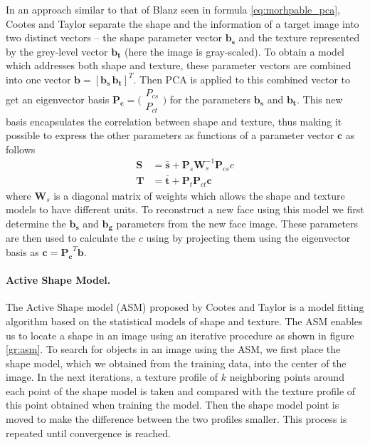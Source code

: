 \documentclass[11pt,a4paper,twoside]{report}
\begin{document}
In an approach similar to that of Blanz seen in formula \ref{eq:morhpable_pca}, Cootes and Taylor separate the shape and the information of a target image into
two distinct vectors -- the shape parameter vector $\mathbf{b_s}$ and the texture
represented by the grey-level vector $\mathbf{b_t}$ (here the image is
gray-scaled). To obtain a model which addresses both shape and texture, these
parameter vectors are combined into one vector $\mathbf{b} = [\mathbf{b_s}\, \mathbf{b_t}]^T$. Then PCA is applied to this combined vector to get an
eigenvector basis $\mathbf{P_c} =
\bigl( \begin{smallmatrix}P_{cs}\\P_{ct}\end{smallmatrix} \bigr)$ for the parameters $\mathbf{b_s}$ and
$\mathbf{b_t}$. This new basis encapsulates the correlation between shape and
texture, thus making it possible to express the other
parameters as functions of a parameter vector $\mathbf{c}$ as follows
\begin{align} \label{gth:shape_mod} 
\mathbf{S} &= \mathbf{\bar{s}} + \mathbf{P}_s \mathbf{W}_s^{-1} \mathbf{P}_{cs}c\\
\label{gth:texture_mod}
\mathbf{T} &= \mathbf{\bar{t}} + \mathbf{P}_t \mathbf{P}_{ct} \mathbf{c}
\end{align}
where $\mathbf{W}_s$ is a diagonal matrix of weights which allows the shape and
texture models to have different units. To reconstruct a new face using this model we first determine the $\mathbf{b_s}$ and
$\mathbf{b_g}$ parameters from the new face image. These parameters are then
used to calculate the $c$ using by projecting them using the eigenvector basis
as $\mathbf{c} = \mathbf{P_c}^T\mathbf{b}$.

\paragraph{Active Shape Model.}
The Active Shape model (ASM) proposed by Cootes and Taylor is a model fitting
algorithm based
on the statistical models of shape and texture. The ASM enables us to locate a
shape in an image using an iterative
procedure as shown in figure \ref{gr:asm}. To search for objects in an image
using the ASM, we first place the shape model, which we obtained from the training data, into
the center of the image. In the next iterations, a texture profile of $k$
neighboring points around each point of the shape model is taken and compared
with the texture profile of this point obtained when training the model. Then
the shape model point is moved to make the difference between the two
profiles smaller. This process is repeated until convergence is reached.
\end{document}

